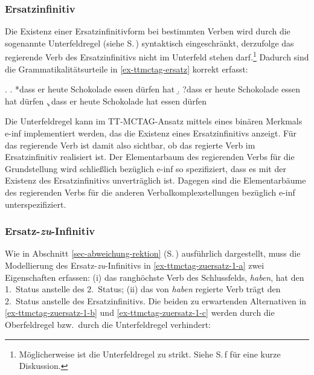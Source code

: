\subsubsection*{Ersatzinfinitiv}

Die Existenz einer Ersatzinfinitivform bei bestimmten Verben wird durch die sogenannte Unterfeldregel (siehe S.\,\pageref{ex-ufr}) syntaktisch eingeschränkt, derzufolge das regierende Verb des Ersatzinfinitivs nicht im Unterfeld stehen darf.\footnote{Möglicherweise ist die Unterfeldregel zu strikt. Siehe S.\,\pageref{ex-ufr}f für eine kurze Diskussion.} Dadurch sind die Grammatikalitätsurteile in \ref{ex-ttmctag-ersatz} korrekt erfasst:

\ex. \label{ex-ttmctag-ersatz}
\a. *dass er heute Schokolade essen dürfen hat
\b. ?dass er heute Schokolade essen hat dürfen
\c. dass er heute Schokolade hat essen dürfen

Die Unterfeldregel kann im TT-MCTAG-Ansatz mittels eines binären Merkmals {\sc e-inf} implementiert werden, das die Existenz eines Ersatzinfinitivs anzeigt. Für das regierende Verb ist damit also sichtbar, ob das regierte Verb im Ersatzinfinitiv realisiert ist. Der Elementarbaum des regierenden Verbs für die Grundstellung wird schlie\ss lich bezüglich {\sc e-inf} so spezifiziert, dass es mit der Existenz des Ersatzinfinitivs unverträglich ist. Dagegen sind die Elementarbäume des regierenden Verbs für die anderen Verbalkomplexstellungen bezüglich {\sc e-inf} unterspezifiziert.

\subsubsection*{Ersatz-\emph{zu}-Infinitiv}

Wie in Abschnitt \ref{sec-abweichung-rektion} (S.\,\pageref{ex-kohaerenz-zuersatz-1}) ausführlich dargestellt, muss die Modellierung des Ersatz-\emph{zu}-Infinitivs in \ref{ex-ttmctag-zuersatz-1-a} zwei Eigenschaften erfassen: (i) das ranghöchste Verb des Schlussfelds, {\it haben}, hat den 1.~Status anstelle des 2.~Status; (ii) das von {\it haben} regierte Verb trägt den 2.~Status anstelle des Ersatzinfinitivs. Die beiden zu erwartenden Alternativen in \ref{ex-ttmctag-zuersatz-1-b} und \ref{ex-ttmctag-zuersatz-1-c} werden durch die Oberfeldregel bzw.\ durch die Unterfeldregel verhindert:

